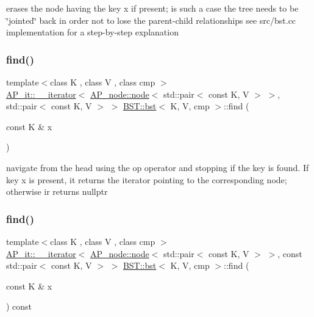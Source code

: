 erases the node having the key x if present; is such a case the tree needs to be \char`\"{}jointed\char`\"{} back in order not to lose the parent-\/child relationships see src/bst.\+cc implementation for a step-\/by-\/step explanation \mbox{\label{classBST_1_1bst_a35880bb25ce5fbe2a10ce004b33cd5f2}} 
\subsubsection{\texorpdfstring{find()}{find()}\hspace{0.1cm}{\footnotesize\ttfamily [1/2]}}
{\footnotesize\ttfamily template$<$class K , class V , class cmp $>$ \\
\hyperlink{classAP__it_1_1____iterator}{A\+P\+\_\+it\+::\+\_\+\+\_\+iterator}$<$ \hyperlink{structAP__node_1_1node}{A\+P\+\_\+node\+::node}$<$ std\+::pair$<$ const K, V $>$ $>$, std\+::pair$<$ const K, V $>$ $>$ \hyperlink{classBST_1_1bst}{B\+S\+T\+::bst}$<$ K, V, cmp $>$\+::find (\begin{DoxyParamCaption}\item[{const K \&}]{x }\end{DoxyParamCaption})}

navigate from the head using the op operator and stopping if the key is found. If key x is present, it returns the iterator pointing to the corresponding node; otherwise ir returns nullptr \mbox{\label{classBST_1_1bst_a5c0e2b56c838441ec33d29c0184b941b}} 
\subsubsection{\texorpdfstring{find()}{find()}\hspace{0.1cm}{\footnotesize\ttfamily [2/2]}}
{\footnotesize\ttfamily template$<$class K , class V , class cmp $>$ \\
\hyperlink{classAP__it_1_1____iterator}{A\+P\+\_\+it\+::\+\_\+\+\_\+iterator}$<$ \hyperlink{structAP__node_1_1node}{A\+P\+\_\+node\+::node}$<$ std\+::pair$<$ const K, V $>$ $>$, const std\+::pair$<$ const K, V $>$ $>$ \hyperlink{classBST_1_1bst}{B\+S\+T\+::bst}$<$ K, V, cmp $>$\+::find (\begin{DoxyParamCaption}\item[{const K \&}]{x }\end{DoxyParamCaption}) const}

